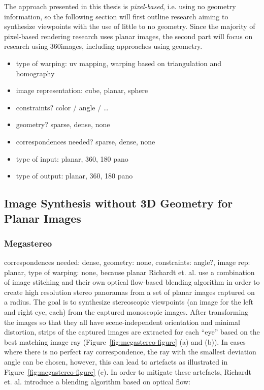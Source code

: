 The approach presented in this thesis is \emph{pixel-based}, i.e. using no geometry information, so the following section will first outline research aiming to synthesize viewpoints with the use of little to no geometry. Since the majority of pixel-based rendering research uses planar images, the second part will focus on research using 360\degree images, including approaches using geometry.

\begin{itemize}
  \item type of warping: uv mapping, warping based on triangulation and homography
  \item image representation: cube, planar, sphere
  \item constraints? color / angle / \ldots
  \item geometry? sparse, dense, none
  \item correspondences needed? sparse, dense, none
  \item type of input: planar, 360, 180 pano
  \item type of output: planar, 360, 180 pano
\end{itemize}

\subsection{Image Synthesis without 3D Geometry for Planar Images}

\subsubsection{Megastereo \label{megastereo}}
correspondences needed: dense, geometry: none, constraints: angle?, image rep: planar, type of warping: none, because planar
Richardt et. al. \cite{megastereo} use a combination of image stitching and their own optical flow-based blending algorithm in order to create high resolution stereo panoramas from a set of planar images captured on a radius. The goal is to synthesize stereoscopic viewpoints (an image for the left and right eye, each) from the captured monoscopic images. After transforming the images so that they all have scene-independent orientation and minimal distortion, strips of the captured images are extracted for each ``eye'' based on the best matching image ray (Figure~\ref{fig:megastereo-figure} (a) and (b)). In cases where there is no perfect ray correspondence, the ray with the smallest deviation angle can be chosen, however, this can lead to artefacts as illustrated in Figure~\ref{fig:megastereo-figure} (c). In order to mitigate these artefacts, Richardt et. al. introduce a blending algorithm based on optical flow: 

